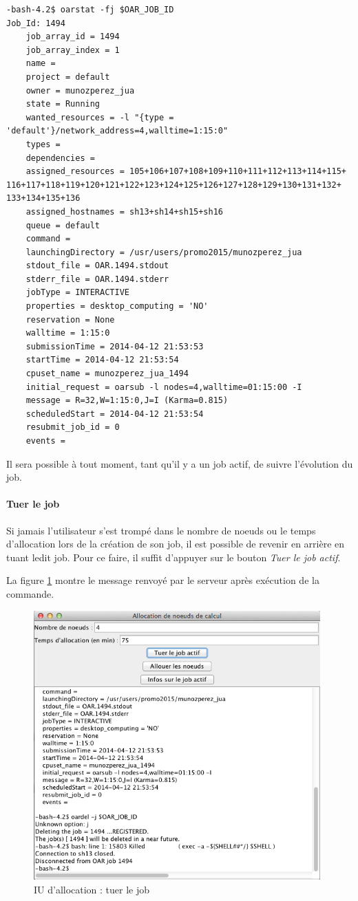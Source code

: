 \begin{verbatim}
-bash-4.2$ oarstat -fj $OAR_JOB_ID
Job_Id: 1494
    job_array_id = 1494
    job_array_index = 1
    name = 
    project = default
    owner = munozperez_jua
    state = Running
    wanted_resources = -l "{type = 'default'}/network_address=4,walltime=1:15:0" 
    types = 
    dependencies = 
    assigned_resources = 105+106+107+108+109+110+111+112+113+114+115+
116+117+118+119+120+121+122+123+124+125+126+127+128+129+130+131+132+
133+134+135+136
    assigned_hostnames = sh13+sh14+sh15+sh16
    queue = default
    command = 
    launchingDirectory = /usr/users/promo2015/munozperez_jua
    stdout_file = OAR.1494.stdout
    stderr_file = OAR.1494.stderr
    jobType = INTERACTIVE
    properties = desktop_computing = 'NO'
    reservation = None
    walltime = 1:15:0
    submissionTime = 2014-04-12 21:53:53
    startTime = 2014-04-12 21:53:54
    cpuset_name = munozperez_jua_1494
    initial_request = oarsub -l nodes=4,walltime=01:15:00 -I
    message = R=32,W=1:15:0,J=I (Karma=0.815)
    scheduledStart = 2014-04-12 21:53:54
    resubmit_job_id = 0
    events = 
\end{verbatim}

\par Il sera possible à tout moment, tant qu'il y a un job actif, de suivre l'évolution du job. 

\paragraph{Tuer le job}
\label{sec:tuer_job}

\par Si jamais l'utilisateur s'est trompé dans le nombre de noeuds ou le temps d'allocation lors de la création de son job, il est possible de revenir en arrière en tuant ledit job. Pour ce faire, il suffit d'appuyer sur le bouton \emph{Tuer le job actif}.
\par La figure \ref{fig:iualloc_kill} montre le message renvoyé par le serveur après exécution de la commande. 

\begin{figure}[h!]
  \centering
  \includegraphics[width=11cm]{images/iuallocation_kill_job.png}
  \caption{IU d'allocation : tuer le job}
  \label{fig:iualloc_kill}
\end{figure}


